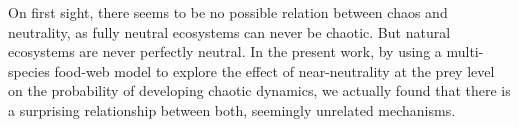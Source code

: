 On first sight, there seems to be no possible relation between chaos and neutrality, as fully neutral ecosystems can never be chaotic. But natural ecosystems are never perfectly neutral. In the present work, by using a multi-species food-web model to explore the effect of near-neutrality at the prey level on the probability of developing chaotic dynamics, we actually found that there is a surprising relationship between both, seemingly unrelated mechanisms. 